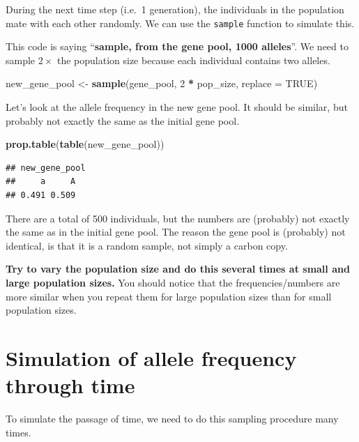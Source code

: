 \documentclass[
  a4paper]{book}
\newenvironment{Shaded}{\begin{snugshade}}{\end{snugshade}}
\newcommand{\AttributeTok}[1]{\textcolor[rgb]{0.13,0.29,0.53}{#1}}
\newcommand{\ConstantTok}[1]{\textcolor[rgb]{0.56,0.35,0.01}{#1}}
\newcommand{\DecValTok}[1]{\textcolor[rgb]{0.00,0.00,0.81}{#1}}
\newcommand{\FunctionTok}[1]{\textcolor[rgb]{0.13,0.29,0.53}{\textbf{#1}}}
\newcommand{\NormalTok}[1]{#1}
\newcommand{\OtherTok}[1]{\textcolor[rgb]{0.56,0.35,0.01}{#1}}
\newcommand{\SpecialCharTok}[1]{\textcolor[rgb]{0.81,0.36,0.00}{\textbf{#1}}}
\begin{document}
During the next time step (i.e.~1 generation), the individuals in the population mate with each other randomly. We can use the \texttt{sample} function to simulate this.

This code is saying ``\textbf{sample, from the gene pool, 1000 alleles}''. We need to sample \(2 \times\) the population size because each individual contains two alleles.

\begin{Shaded}
\begin{Highlighting}[]
\NormalTok{new\_gene\_pool }\OtherTok{\textless{}{-}} \FunctionTok{sample}\NormalTok{(gene\_pool, }\DecValTok{2} \SpecialCharTok{*}\NormalTok{ pop\_size, }\AttributeTok{replace =} \ConstantTok{TRUE}\NormalTok{)}
\end{Highlighting}
\end{Shaded}

Let's look at the allele frequency in the new gene pool. It should be similar, but probably not exactly the same as the initial gene pool.

\begin{Shaded}
\begin{Highlighting}[]
\FunctionTok{prop.table}\NormalTok{(}\FunctionTok{table}\NormalTok{(new\_gene\_pool))}
\end{Highlighting}
\end{Shaded}

\begin{verbatim}
## new_gene_pool
##     a     A 
## 0.491 0.509
\end{verbatim}

There are a total of 500 individuals, but the numbers are (probably) not exactly the same as in the initial gene pool. The reason the gene pool is (probably) not identical, is that it is a random sample, not simply a carbon copy.

\textbf{Try to vary the population size and do this several times at small and large population sizes.} You should notice that the frequencies/numbers are more similar when you repeat them for large population sizes than for small population sizes.

\section{Simulation of allele frequency through time}\label{simulation-of-allele-frequency-through-time}

To simulate the passage of time, we need to do this sampling procedure many times.
\end{document}
